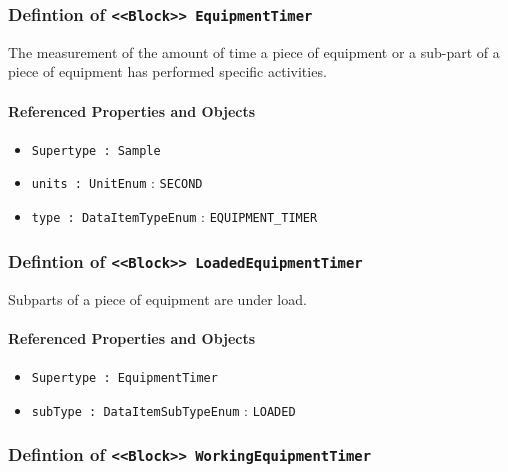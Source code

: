 \subsubsection{Defintion of \texttt{<<Block>> EquipmentTimer}}
  \label{type:EquipmentTimer}

\FloatBarrier

The measurement of the amount of time a piece of equipment or a sub-part of a piece of equipment has performed specific activities.

\FloatBarrier
\paragraph{Referenced Properties and Objects}

\begin{itemize}
\item \texttt{Supertype : Sample}

\item \texttt{units : UnitEnum} : \texttt{SECOND}

\item \texttt{type : DataItemTypeEnum} : \texttt{EQUIPMENT_TIMER}

\end{itemize}
\FloatBarrier
\subsubsection{Defintion of \texttt{<<Block>> LoadedEquipmentTimer}}
  \label{type:LoadedEquipmentTimer}

\FloatBarrier

Subparts of a piece of equipment are under load.

\FloatBarrier
\paragraph{Referenced Properties and Objects}

\begin{itemize}
\item \texttt{Supertype : EquipmentTimer}

\item \texttt{subType : DataItemSubTypeEnum} : \texttt{LOADED}

\end{itemize}
\FloatBarrier
\subsubsection{Defintion of \texttt{<<Block>> WorkingEquipmentTimer}}
  \label{type:WorkingEquipmentTimer}

